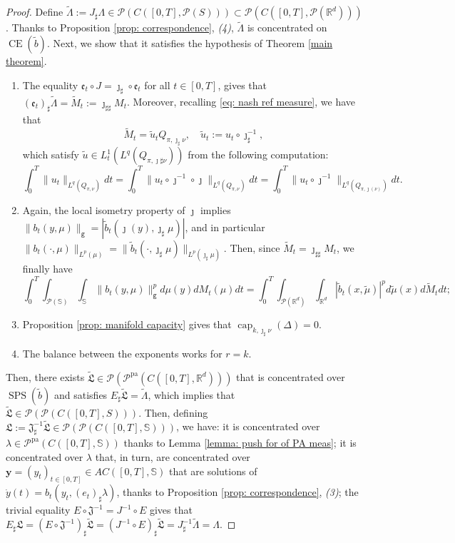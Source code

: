 \documentclass[10pt,leqno]{amsart}
\numberwithin{equation}{section}
\newcommand{\R}{\mathbb{R}}
\newcommand{\PP}{\mathcal{P}}
\newcommand{\PPpa}{\PP^{\operatorname{pa}}}
\newcommand{\ttg}{\mathtt{g}}
\newcommand{\Ss}{\mathbb{S}}
\begin{document}
\begin{proof}
    Define $\tilde\Lambda := J_\sharp \Lambda \in \PP(C([0,T],\PP(S))) \subset \PP(C([0,T],\PP(\R^d)))$. Thanks to Proposition \ref{prop: correspondence}, \textit{(4)}, $\tilde\Lambda$ is concentrated on $\operatorname{CE}(\tilde{b})$. Next, we show that it satisfies the hypothesis of Theorem \ref{main theorem}.
    \begin{enumerate}
        \item The equality $\mathfrak{e}_t\circ J = \jmath_\sharp \circ \mathfrak{e}_t$ for all $t\in[0,T]$, gives that $(\mathfrak{e}_t)_\sharp \tilde\Lambda = \tilde{M}_t := \jmath_{\sharp\sharp} M_t$. Moreover, recalling \eqref{eq: nash ref measure}, we have that 
        \[\tilde{M}_t = \tilde{u}_t Q_{\pi,\jmath_\sharp \nu}, \quad \tilde{u}_t := u_t \circ \jmath_{\sharp}^{-1},\]
        which satisfy $\tilde{u}\in L^1_t(L^q(Q_{\pi,\jmath\sharp \nu}))$ from the following computation:
        \[ \int_0^T \|u_t\|_{L^q(Q_{\pi,\nu})} dt = \int_0^T \|u_t\circ \boldsymbol{\jmath}^{-1} \circ \boldsymbol{\jmath}\|_{L^q(Q_{\pi,\nu})} dt = \int_0^T \|u_t\circ \boldsymbol{\jmath}^{-1}\|_{L^q(Q_{\pi,\boldsymbol{\jmath}(\nu)})} dt. \]
        \item Again, the local isometry property of $\jmath$ implies $\|b_t(y,\mu)\|_{\ttg} =|\tilde{b}_t(\jmath(y), \jmath_\sharp \mu)|$, and in particular $\|b_t(\cdot,\mu)\|_{L^p(\mu)} = \|\tilde{b}_t(\cdot,\jmath_\sharp\mu)\|_{L^p(\jmath_\sharp \mu)}$. Then, since $\tilde{M}_t = \jmath_{\sharp\sharp}M_t$, we finally have
        \[\int_0^T \int_{\PP(\Ss)}\int_{\Ss} \|b_t(y,\mu)\|_{\ttg}^p d\mu(y)dM_t(\mu)dt = \int_0^T \int_{\PP(\R^d)} \int_{\R^d} |\tilde{b}_t(x,\tilde{\mu})|^p d\tilde{\mu}(x) d\tilde{M}_tdt; \]
        \item Proposition \ref{prop: manifold capacity} gives that $\operatorname{cap}_{k,\jmath_\sharp\nu}(\Delta) = 0$.
        \item The balance between the exponents works for $r = k$.
    \end{enumerate}
    Then, there exists $\tilde{\mathfrak{L}} \in \PP(\PPpa(C([0,T],\R^d)))$ that is concentrated over $\operatorname{SPS}(\tilde{b})$ and satisfies $E_\sharp \tilde{\mathfrak{L}} = \tilde\Lambda$, which implies that $\mathfrak{\tilde{L}}\in \PP(\PP(C([0,T],S)))$. Then, defining $\mathfrak{L} := \mathfrak{J}^{-1}_\sharp \tilde{\mathfrak{L}} \in \PP(\PP(C([0,T],\Ss)))$, we have: it is concentrated over $\lambda \in \PPpa(C([0,T],\Ss))$ thanks to Lemma \ref{lemma: push for of PA meas}; it is concentrated over $\lambda$ that, in turn, are concentrated over $\boldsymbol{y} = (y_t)_{t\in [0,T]} \in AC([0,T],\Ss)$ that are solutions of $\dot{y}(t) = b_t(y_t,(e_t)_\sharp \lambda)$, thanks to Proposition \ref{prop: correspondence}, \textit{(3)}; the trivial equality $E\circ \mathfrak{J}^{-1} = J^{-1}\circ E$ gives that $E_\sharp \mathfrak{L} = (E\circ \mathfrak{J}^{-1})_\sharp \tilde{\mathfrak{L}} = (J^{-1} \circ E)_\sharp \tilde{\mathfrak{L}} = J^{-1}_\sharp \tilde\Lambda = \Lambda$. 
\end{proof}
\end{document}
